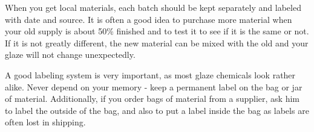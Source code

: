 When you get local materials, each batch should be kept separately and labeled 
with date and source. It is often a good idea to purchase more material when 
your old supply is about 50\% finished and to test it to see if it is the same 
or not. If it is not greatly different, the new material can be mixed with the 
old and your glaze will not change unexpectedly.

A good labeling system is very important, as most glaze chemicals look rather 
alike. Never depend on your memory - keep a permanent label on the bag or jar 
of material. Additionally, if you order bags of material from a supplier, ask 
him to label the outside of the bag, and also to put a label inside the bag as 
labels are often lost in shipping.
